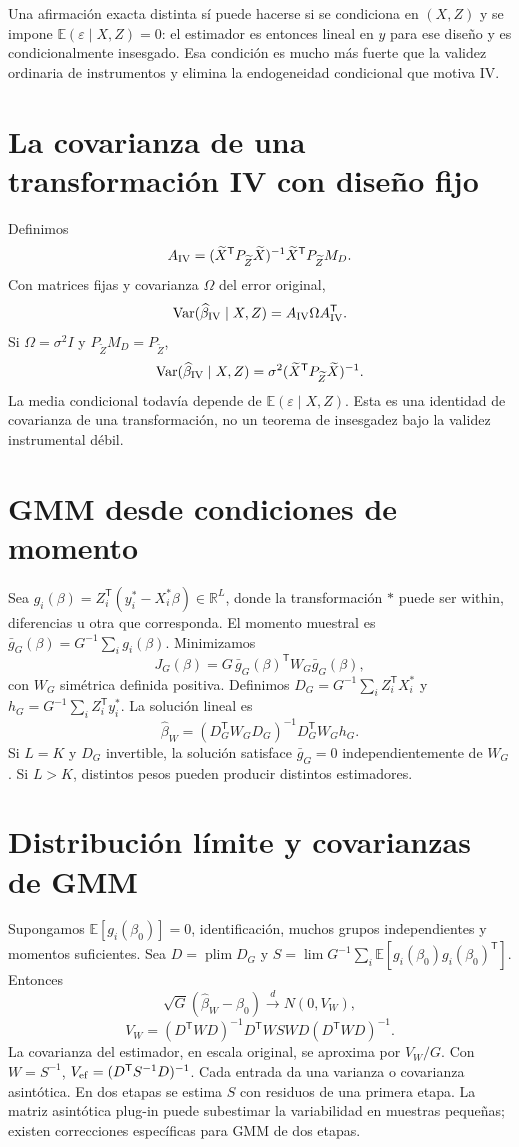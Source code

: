 \documentclass[11pt,a4paper]{article}
\newcommand{\R}{\mathbb R}
\newcommand{\E}{\mathbb E}
\newcommand{\T}{^{\mathsf T}}
\DeclareMathOperator{\Var}{Var}
\theoremstyle{definition}
\DeclareMathOperator{\plim}{plim}
\newcommand{\eps}{\varepsilon}
\begin{document}
Una afirmación exacta distinta sí puede hacerse si se condiciona en $(X,Z)$ y se impone $\E(\eps\mid X,Z)=0$:
el estimador es entonces lineal en $y$ para ese diseño y es condicionalmente insesgado. Esa condición es mucho más fuerte que la validez ordinaria de instrumentos y elimina la endogeneidad condicional que motiva IV.

\section{La covarianza de una transformación IV con diseño fijo}
Definimos
\[
A_{\rm IV}=(\widetilde X\T P_{\widetilde Z}\widetilde X)^{-1}
\widetilde X\T P_{\widetilde Z}M_D.
\]
Con matrices fijas y covarianza $\Omega$ del error original,
\[
\Var(\widehat\beta_{\rm IV}\mid X,Z)=A_{\rm IV}\Omega A_{\rm IV}\T.
\]
Si $\Omega=\sigma^2I$ y $P_{\widetilde Z}M_D=P_{\widetilde Z}$,
\[
\Var(\widehat\beta_{\rm IV}\mid X,Z)
=\sigma^2(\widetilde X\T P_{\widetilde Z}\widetilde X)^{-1}.
\]
La media condicional todavía depende de $\E(\eps\mid X,Z)$.
Esta es una identidad de covarianza de una transformación, no un teorema de insesgadez bajo la validez instrumental débil.

\section{GMM desde condiciones de momento}
Sea $g_i(\beta)=Z_i\T(y_i^*-X_i^*\beta)\in\R^L$, donde la transformación $*$ puede ser within, diferencias u otra que corresponda.
El momento muestral es $\bar g_G(\beta)=G^{-1}\sum_i g_i(\beta)$.
Minimizamos
\[
J_G(\beta)=G\,\bar g_G(\beta)\T W_G\bar g_G(\beta),
\]
con $W_G$ simétrica definida positiva.
Definimos $D_G=G^{-1}\sum_i Z_i\T X_i^*$ y
$h_G=G^{-1}\sum_iZ_i\T y_i^*$.
La solución lineal es
\[
\widehat\beta_W=(D_G\T W_GD_G)^{-1}D_G\T W_Gh_G.
\]
Si $L=K$ y $D_G$ invertible, la solución satisface $\bar g_G=0$ independientemente de $W_G$. Si $L>K$, distintos pesos pueden producir distintos estimadores.

\section{Distribución límite y covarianzas de GMM}
Supongamos $\E[g_i(\beta_0)]=0$, identificación, muchos grupos independientes y momentos suficientes. Sea
$D=\plim D_G$ y $S=\lim G^{-1}\sum_i\E[g_i(\beta_0)g_i(\beta_0)\T]$.
Entonces
\[
\sqrt G(\widehat\beta_W-\beta_0)\overset d\longrightarrow
N(0,V_W),
\]
\[
V_W=(D\T WD)^{-1}D\T WSWD(D\T WD)^{-1}.
\]
La covarianza del estimador, en escala original, se aproxima por $V_W/G$.
Con $W=S^{-1}$,
$V_{\rm ef}=(D\T S^{-1}D)^{-1}$.
Cada entrada da una varianza o covarianza asintótica. En dos etapas se estima $S$ con residuos de una primera etapa. La matriz asintótica plug-in puede subestimar la variabilidad en muestras pequeñas; existen correcciones específicas para GMM de dos etapas.
\end{document}
